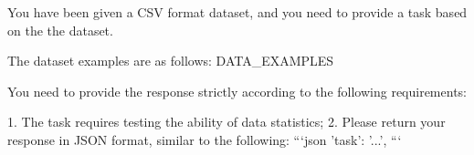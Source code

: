\begin{tcolorbox}[colback=cadmiumgreen!5!white,colframe=forestgreen!75!white,breakable,title=\textit{Prompt for task construction in data statistics.}]
\begin{VerbatimWrap}
You have been given a CSV format dataset, and you need to provide a task based on the the dataset.

The dataset examples are as follows:
{{DATA_EXAMPLES}}

You need to provide the response strictly according to the following requirements:

1. The task requires testing the ability of data statistics;
2. Please return your response in JSON format, similar to the following:
```json
{
    'task': '...',
}
```
\end{VerbatimWrap}
\end{tcolorbox}
